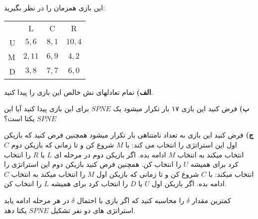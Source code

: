 این بازی همزمان را در نظر بگیرید:
\LTR 
\begin{latin}
    \begin{center}
        \begin{tabular}{r | c | c | c |}
            \multicolumn{1}{r}{} &
            \multicolumn{1}{c}{L} &
            \multicolumn{1}{c}{C} &
            \multicolumn{1}{c}{R} \\ \cline{2-4}
            U       & $5,6$   & $8,1$     & $10,4$  \\ \cline{2-4}
            M       & $2,11$  & $6,9$    & $4,2$  \\ \cline{2-4}
            D       & $3,8$   & $7,7$     & $6,0$ \\ \cline{2-4}
        \end{tabular}
    \end{center}
\end{latin}
\RTL

\textbf{الف)}
تمام تعادلهای نش خالص این بازی را پیدا کنید.

\vspace*{5pt}
\textbf{ب)}
فرض کنید این بازی ۱۷ بار تکرار میشود یک $SPNE$ برای این بازی پیدا کنید آیا این $SPNE$ یکتا است؟

\vspace*{5pt}
\textbf{ج)}
فرض کنید این بازی به تعداد نامتناهی بار تکرار میشود همچنین فرض کنید که بازیکن اول این استراتژی را انتخاب می کند: با $M$ شروع کن و تا زمانی که بازیکن دوم $C$ انتخاب میکند به انتخاب $M$ ادامه بده. اگر بازیکن دوم در مرحله ای $L$ یا $R$ را انتخاب کرد برای همیشه $U$ را انتخاب کن. همچنین فرض کنید بازیکن دوم این استراتژی را انتخاب میکند: با $C$ شروع کن و تا زمانی که بازیکن اول $M$ را انتخاب میکند به انتخاب $C$ ادامه بده. اگر بازیکن اول $U$ یا $D$ را انتخاب کرد برای همیشه $L$ را انتخاب کن.

کمترین مقدار $\delta$ را محاسبه کنید که اگر بازی با احتمال $\delta$ در هر مرحله ادامه یابد استراتژی های دو نفر تشکیل $SPNE$ یکتا دهد.